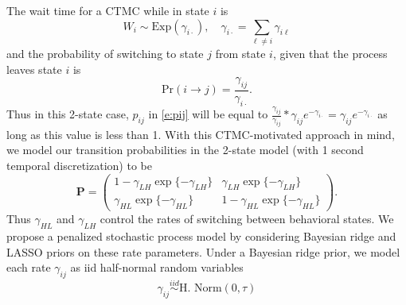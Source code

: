 \documentclass[cmbright,fleqn,referee]{envauth}
\begin{document}
The wait time for a CTMC while in state $i$ is
\begin{equation}
W_{i} \sim \text{Exp}(\gamma_{i \cdot}), \quad \gamma_{i \cdot} = \sum_{\ell \neq i} \gamma_{i\ell}
\end{equation}
and the probability of switching to state $j$ from state $i$, given that the process leaves state $i$ is
\begin{equation}
 \text{Pr}(i \rightarrow j) = \frac{\gamma_{ij}}{\gamma_{i \cdot }}.
\end{equation}
Thus in this 2-state case, $p_{ij}$ in  \eqref{e:pij} will be equal to $\frac{\gamma_{ij}} {\gamma_{ij}} * \gamma_{ij} e^{-\gamma_{i\cdot}} = \gamma_{ij}e^{-\gamma_{i\cdot}}$ as long as this value is less than 1.   
With this CTMC-motivated approach in mind, we model our transition probabilities in the 2-state model (with 1 second temporal discretization) to be
\begin{equation}
\mathbf{P} = \begin{pmatrix}
1- \gamma_{LH}\exp\{- \gamma_{LH} \} & \gamma_{LH}\exp\{- \gamma_{LH} \}\\
\gamma_{HL} \exp\{- \gamma_{HL}\} & 1 - \gamma_{HL} \exp\{- \gamma_{HL}\}
\end{pmatrix}.
\label{e:2statePTM}
\end{equation}
Thus $\gamma_{HL}$ and $\gamma_{LH}$ control the rates of switching between behavioral states. We propose a penalized stochastic process model by considering Bayesian ridge and LASSO priors on these rate parameters. Under a Bayesian ridge prior, we model each rate $\gamma_{ij}$ as iid half-normal random variables
\begin{equation}
\gamma_{ij} \stackrel{iid}{\sim} \text{H. Norm}(0, \tau) 
\end{equation}
\end{document}
